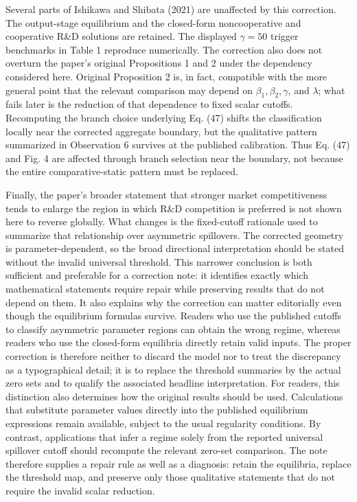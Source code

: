 Several parts of Ishikawa and Shibata (2021) are unaffected by this correction. The output-stage equilibrium and the closed-form noncooperative and cooperative R\&D solutions are retained. The displayed $\gamma=50$ trigger benchmarks in Table 1 reproduce numerically. The correction also does not overturn the paper's original Propositions 1 and 2 under the dependency considered here. Original Proposition 2 is, in fact, compatible with the more general point that the relevant comparison may depend on $\beta_1,\beta_2,\gamma$, and $\lambda$; what fails later is the reduction of that dependence to fixed scalar cutoffs. Recomputing the branch choice underlying Eq. (47) shifts the classification locally near the corrected aggregate boundary, but the qualitative pattern summarized in Observation 6 survives at the published calibration. Thus Eq. (47) and Fig. 4 are affected through branch selection near the boundary, not because the entire comparative-static pattern must be replaced.

Finally, the paper's broader statement that stronger market competitiveness tends to enlarge the region in which R\&D competition is preferred is not shown here to reverse globally. What changes is the fixed-cutoff rationale used to summarize that relationship over asymmetric spillovers. The corrected geometry is parameter-dependent, so the broad directional interpretation should be stated without the invalid universal threshold. This narrower conclusion is both sufficient and preferable for a correction note: it identifies exactly which mathematical statements require repair while preserving results that do not depend on them. It also explains why the correction can matter editorially even though the equilibrium formulas survive. Readers who use the published cutoffs to classify asymmetric parameter regions can obtain the wrong regime, whereas readers who use the closed-form equilibria directly retain valid inputs. The proper correction is therefore neither to discard the model nor to treat the discrepancy as a typographical detail; it is to replace the threshold summaries by the actual zero sets and to qualify the associated headline interpretation.
For readers, this distinction also determines how the original results should be used. Calculations that substitute parameter values directly into the published equilibrium expressions remain available, subject to the usual regularity conditions. By contrast, applications that infer a regime solely from the reported universal spillover cutoff should recompute the relevant zero-set comparison. The note therefore supplies a repair rule as well as a diagnosis: retain the equilibria, replace the threshold map, and preserve only those qualitative statements that do not require the invalid scalar reduction.

